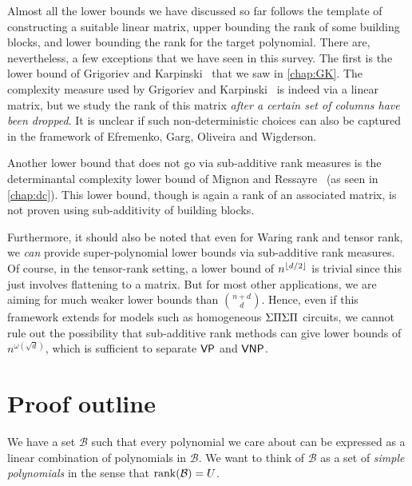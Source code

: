 Almost all the lower bounds we have discussed so far follows the template of constructing a suitable linear matrix, upper bounding the rank of some building blocks, and lower bounding the rank for the target polynomial. There are, nevertheless, a few exceptions that we have seen in this survey. The first is the lower bound of Grigoriev and Karpinski~\cite{grigoriev98} that we saw in \autoref{chap:GK}. The complexity measure used by Grigoriev and Karpinski~\cite{gr00} is indeed via a linear matrix, but we study the rank of this matrix \emph{after a certain set of columns have been dropped}. It is unclear if such non-deterministic choices can also be captured in the framework of Efremenko, Garg, Oliveira and Wigderson.

Another lower bound that does not go via sub-additive rank measures is the determinantal complexity lower bound of Mignon and Ressayre~\cite{mr04} (as seen in \autoref{chap:dc}). This lower bound, though is again a rank of an associated matrix, is not proven using sub-additivity of building blocks.

Furthermore, it should also be noted that even for Waring rank and tensor rank, we \emph{can} provide super-polynomial lower bounds via sub-additive rank measures. Of course, in the tensor-rank setting, a lower bound of $n^{\lfloor d/2 \rfloor}$ is trivial since this just involves flattening to a matrix. But for most other applications, we are aiming for much weaker lower bounds than $\binom{n+d}{d}$. Hence, even if this framework extends for models such as homogeneous $\Sigma\Pi\Sigma\Pi$ circuits, we cannot rule out the possibility that sub-additive rank methods can give lower bounds of $n^{\omega(\sqrt{d})}$, which is sufficient to separate $\mathsf{VP}$ and $\mathsf{VNP}$. 

\section*{Proof outline}

We have a set $\mathcal{B}$ such that every polynomial we care about can be expressed as a linear combination of polynomials in $\mathcal{B}$. We want to think of $\mathcal{B}$ as a set of \emph{simple polynomials} in the sense that  $\operatorname{rank}(\mathcal{B}) = U$.

